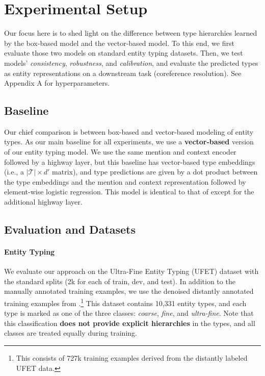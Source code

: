 \documentclass[11pt,a4paper]{article}
\begin{document}
\section{Experimental Setup}\label{sec:experiments}

Our focus here is to shed light on the difference between type hierarchies learned by the box-based model and the vector-based model. To this end, we first evaluate those two models on standard entity typing datasets. Then, we test models' \emph{consistency}, \emph{robustness}, and \emph{calibration}, and evaluate the predicted types as entity representations on a downstream task (coreference resolution). See Appendix A for hyperparameters.

\subsection{Baseline}

Our chief comparison is between box-based and vector-based modeling of entity types. As our main baseline for all experiments, we use a \textbf{vector-based} version of our entity typing model. We use the same mention and context encoder followed by a highway layer, but this baseline has vector-based type embeddings (i.e., a $| \mathcal{T}|  \times d'$ matrix), and type predictions are given by a dot product between the type embeddings and the mention and context representation followed by element-wise logistic regression. This model is identical to that of \citet{Yasumasa_Onoe_20_Findings} except for the additional highway layer.

\subsection{Evaluation and Datasets}

\paragraph{Entity Typing} We evaluate our approach on the Ultra-Fine Entity Typing (UFET) dataset \citep{Eunsol_Choi_18} with the standard splits (2k for each of train, dev, and test). In addition to the manually annotated training examples, we use the denoised distantly annotated training examples from \citet{Yasumasa_Onoe_19}.\footnote{This consists of 727k training examples derived from the distantly labeled UFET data.} This dataset contains 10,331 entity types, and each type is marked as one of the three classes: \emph{coarse}, \emph{fine}, and \emph{ultra-fine}. Note that this classification \textbf{does not provide explicit hierarchies} in the types, and all classes are treated equally during training.
\end{document}
